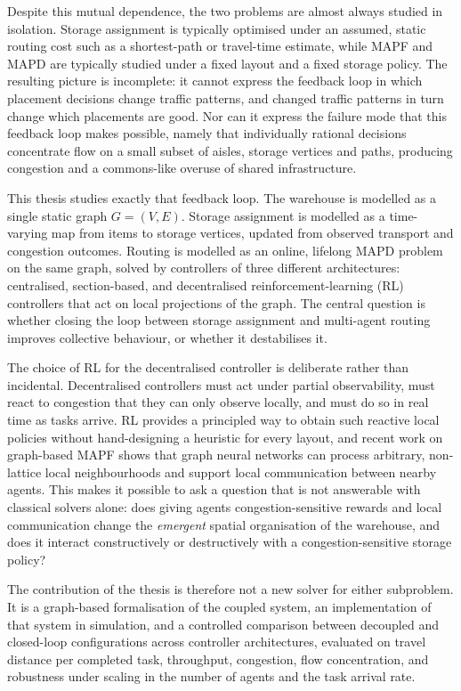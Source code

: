 Despite this mutual dependence, the two problems are almost always studied
in isolation. Storage assignment is typically optimised under an assumed,
static routing cost such as a shortest-path or travel-time estimate, while
MAPF and MAPD are typically studied under a fixed layout and a fixed storage
policy. The resulting picture is incomplete: it cannot express the feedback
loop in which placement decisions change traffic patterns, and changed
traffic patterns in turn change which placements are good. Nor can it
express the failure mode that this feedback loop makes possible, namely that
individually rational decisions concentrate flow on a small subset of
aisles, storage vertices and paths, producing congestion and a commons-like
overuse of shared infrastructure.

This thesis studies exactly that feedback loop. The warehouse is modelled as
a single static graph \( G = (V, E) \). Storage assignment is modelled as a
time-varying map from items to storage vertices, updated from observed
transport and congestion outcomes. Routing is modelled as an online,
lifelong MAPD problem on the same graph, solved by controllers of three
different architectures: centralised, section-based, and decentralised
reinforcement-learning (RL) controllers that act on local projections of the
graph. The central question is whether closing the loop between storage
assignment and multi-agent routing improves collective behaviour, or whether
it destabilises it.

The choice of RL for the decentralised controller is deliberate rather than
incidental. Decentralised controllers must act under partial observability,
must react to congestion that they can only observe locally, and must do so
in real time as tasks arrive. RL provides a principled way to obtain such
reactive local policies without hand-designing a heuristic for every layout,
and recent work on graph-based MAPF shows that graph neural networks can
process arbitrary, non-lattice local neighbourhoods and support local
communication between nearby agents. This makes it possible to ask a
question that is not answerable with classical solvers alone: does giving
agents congestion-sensitive rewards and local communication change the
\emph{emergent} spatial organisation of the warehouse, and does it interact
constructively or destructively with a congestion-sensitive storage policy?

The contribution of the thesis is therefore not a new solver for either
subproblem. It is a graph-based formalisation of the coupled system, an
implementation of that system in simulation, and a controlled comparison
between decoupled and closed-loop configurations across controller
architectures, evaluated on travel distance per completed task, throughput,
congestion, flow concentration, and robustness under scaling in the number
of agents and the task arrival rate.


